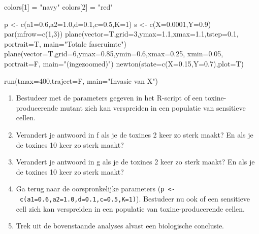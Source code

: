\documentclass[
  letterpaper,
  DIV=11,
  numbers=noendperiod]{scrartcl}
\newenvironment{Shaded}{\begin{snugshade}}{\end{snugshade}}
\newcommand{\AttributeTok}[1]{\textcolor[rgb]{0.40,0.45,0.13}{#1}}
\newcommand{\DecValTok}[1]{\textcolor[rgb]{0.68,0.00,0.00}{#1}}
\newcommand{\FloatTok}[1]{\textcolor[rgb]{0.68,0.00,0.00}{#1}}
\newcommand{\FunctionTok}[1]{\textcolor[rgb]{0.28,0.35,0.67}{#1}}
\newcommand{\NormalTok}[1]{\textcolor[rgb]{0.00,0.23,0.31}{#1}}
\newcommand{\OtherTok}[1]{\textcolor[rgb]{0.00,0.23,0.31}{#1}}
\newcommand{\StringTok}[1]{\textcolor[rgb]{0.13,0.47,0.30}{#1}}
\providecommand{\tightlist}{%
  \setlength{\itemsep}{0pt}\setlength{\parskip}{0pt}}
\begin{document}
\begin{tcolorbox}
\begin{Shaded}
\begin{Highlighting}[]
\NormalTok{colors[}\DecValTok{1}\NormalTok{] }\OtherTok{=} \StringTok{"navy"}
\NormalTok{colors[}\DecValTok{2}\NormalTok{] }\OtherTok{=} \StringTok{"red"}

\NormalTok{p }\OtherTok{\textless{}{-}} \FunctionTok{c}\NormalTok{(}\AttributeTok{a1=}\FloatTok{0.6}\NormalTok{,}\AttributeTok{a2=}\FloatTok{1.0}\NormalTok{,}\AttributeTok{d=}\FloatTok{0.1}\NormalTok{,}\AttributeTok{c=}\FloatTok{0.5}\NormalTok{,}\AttributeTok{K=}\DecValTok{1}\NormalTok{)}
\NormalTok{s }\OtherTok{\textless{}{-}} \FunctionTok{c}\NormalTok{(}\AttributeTok{X=}\FloatTok{0.0001}\NormalTok{,}\AttributeTok{Y=}\FloatTok{0.9}\NormalTok{)}
\FunctionTok{par}\NormalTok{(}\AttributeTok{mfrow=}\FunctionTok{c}\NormalTok{(}\DecValTok{1}\NormalTok{,}\DecValTok{3}\NormalTok{))}
\FunctionTok{plane}\NormalTok{(}\AttributeTok{vector=}\NormalTok{T,}\AttributeTok{grid=}\DecValTok{3}\NormalTok{,}\AttributeTok{ymax=}\FloatTok{1.1}\NormalTok{,}\AttributeTok{xmax=}\FloatTok{1.1}\NormalTok{,}\AttributeTok{tstep=}\FloatTok{0.1}\NormalTok{, }\AttributeTok{portrait=}\NormalTok{T, }\AttributeTok{main=}\StringTok{"Totale faseruimte"}\NormalTok{)}
\FunctionTok{plane}\NormalTok{(}\AttributeTok{vector=}\NormalTok{T,}\AttributeTok{grid=}\DecValTok{6}\NormalTok{,}\AttributeTok{ymax=}\FloatTok{0.85}\NormalTok{,}\AttributeTok{ymin=}\FloatTok{0.6}\NormalTok{,}\AttributeTok{xmax=}\FloatTok{0.25}\NormalTok{, }\AttributeTok{xmin=}\FloatTok{0.05}\NormalTok{, }\AttributeTok{portrait=}\NormalTok{F, }\AttributeTok{main=}\StringTok{"(ingezoomed)"}\NormalTok{)}
\FunctionTok{newton}\NormalTok{(}\AttributeTok{state=}\FunctionTok{c}\NormalTok{(}\AttributeTok{X=}\FloatTok{0.15}\NormalTok{,}\AttributeTok{Y=}\FloatTok{0.7}\NormalTok{),}\AttributeTok{plot=}\NormalTok{T)}

\FunctionTok{run}\NormalTok{(}\AttributeTok{tmax=}\DecValTok{400}\NormalTok{,}\AttributeTok{traject=}\NormalTok{F, }\AttributeTok{main=}\StringTok{"Invasie van X"}\NormalTok{)}
\end{Highlighting}
\end{Shaded}

\begin{enumerate}
\def\labelenumi{\alph{enumi}.}
\setcounter{enumi}{6}
\tightlist
\item
  Bestudeer met de parameters gegeven in het R-script of een
  toxine-producerende mutant zich kan verspreiden in een populatie van
  sensitieve cellen.
\item
  Verandert je antwoord in f als je de toxines 2 keer zo sterk maakt? En
  als je de toxines 10 keer zo sterk maakt?
\item
  Verandert je antwoord in g als je de toxines 2 keer zo sterk maakt? En
  als je de toxines 10 keer zo sterk maakt?
\item
  Ga terug naar de oorspronkelijke parameters
  (\texttt{p\ \textless{}-\ c(a1=0.6,a2=1.0,d=0.1,c=0.5,K=1)}).
  Bestudeer nu ook of een sensitieve cell zich kan verspreiden in een
  populatie van toxine-producerende cellen.
\item
  Trek uit de bovenstaande analyses alvast een biologische conclusie.
\end{enumerate}


\end{tcolorbox}
\end{document}
